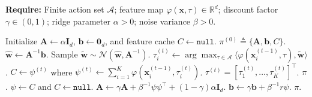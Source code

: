 \begin{algorithm}[t]
\caption{(Contextual case; per-client) Discounted LinTS}
\label{alg:dlints}
\textbf{Require:} Finite action set $\mathcal A$; feature map $\varphi(\boldsymbol{x},\tau)\in\mathbb R^d$; discount factor $\gamma\in(0,1)$; ridge parameter $\alpha>0$; noise variance $\beta>0$.
\begin{algorithmic}[1]
    \State Initialize $\boldsymbol{A}\gets \alpha \boldsymbol{I}_d$, $\boldsymbol{b}\gets \boldsymbol{0}_d$, and feature cache $C\gets \texttt{null}$.
    \State \Return $\pi^{(0)} \triangleq \{\boldsymbol{A},\boldsymbol{b},C\}$.
\EndProcedure
{}
    \State $\hat{\boldsymbol{w}} \gets \boldsymbol{A}^{-1}\boldsymbol{b}$.
    \State Sample $\tilde{\boldsymbol{w}} \sim \mathcal N(\hat{\boldsymbol{w}}, \boldsymbol{A}^{-1})$.
        \State $\tau_i^{(t)} \gets \arg\max_{\tau\in\mathcal A}\langle \varphi(\boldsymbol{x}_i^{(t-1)},\tau),\tilde{\boldsymbol{w}}\rangle$.
    \EndFor
    \State $C \gets \psi^{(t)}$ where $\psi^{(t)} \gets \sum_{i=1}^K \varphi(\boldsymbol{x}_i^{(t-1)},\tau_i^{(t)})$.
    \State \Return $\tau^{(t)} = [\tau_1^{(t)},\ldots,\tau_K^{(t)}]^\top$.
\EndProcedure
{}
     \State \Return $\pi$. \EndIf
    \State $\psi \gets C$ and $C\gets \texttt{null}$.
    \State $\boldsymbol{A} \gets \gamma \boldsymbol{A} + \beta^{-1}\psi\psi^\top + (1-\gamma)\alpha \boldsymbol{I}_d$.
    \State $\boldsymbol{b} \gets \gamma \boldsymbol{b} + \beta^{-1}r\psi$.
    \State \Return $\pi$.
\EndProcedure
\end{algorithmic}
\end{algorithm}